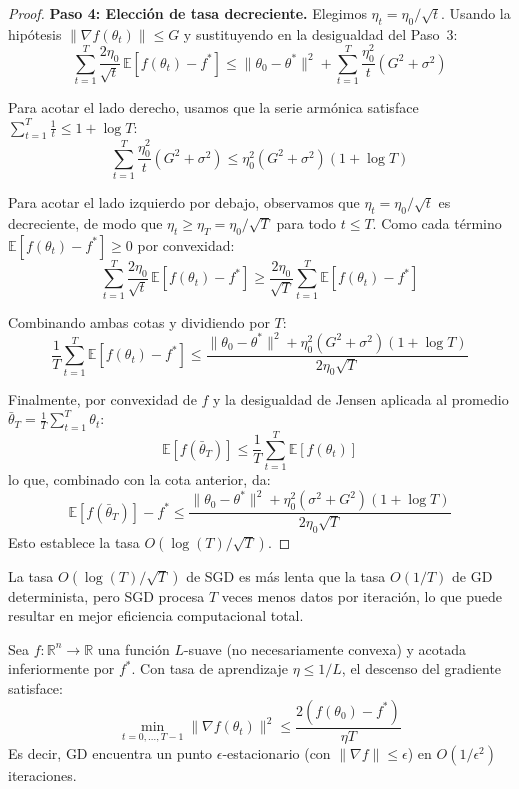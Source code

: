 \begin{proof}
	\textbf{Paso 4: Elección de tasa decreciente.}
	Elegimos \(\eta_t = \eta_0/\sqrt{t}\). Usando la hipótesis \(\|\nabla f(\theta_t)\| \leq G\) y sustituyendo en la desigualdad del Paso~3:
	\[
		\sum_{t=1}^T \frac{2\eta_0}{\sqrt{t}}\, \mathbb{E}[f(\theta_t) - f^*] \leq \|\theta_0 - \theta^*\|^2 + \sum_{t=1}^T \frac{\eta_0^2}{t}(G^2 + \sigma^2)
	\]

	Para acotar el lado derecho, usamos que la serie armónica satisface \(\sum_{t=1}^T \frac{1}{t} \leq 1 + \log T\):
	\[
		\sum_{t=1}^T \frac{\eta_0^2}{t}(G^2 + \sigma^2) \leq \eta_0^2(G^2 + \sigma^2)(1 + \log T)
	\]

	Para acotar el lado izquierdo por debajo, observamos que \(\eta_t = \eta_0/\sqrt{t}\) es decreciente, de modo que \(\eta_t \geq \eta_T = \eta_0/\sqrt{T}\) para todo \(t \leq T\). Como cada término \(\mathbb{E}[f(\theta_t) - f^*] \geq 0\) por convexidad:
	\[
		\sum_{t=1}^T \frac{2\eta_0}{\sqrt{t}}\, \mathbb{E}[f(\theta_t) - f^*] \geq \frac{2\eta_0}{\sqrt{T}} \sum_{t=1}^T \mathbb{E}[f(\theta_t) - f^*]
	\]

	Combinando ambas cotas y dividiendo por \(T\):
	\[
		\frac{1}{T}\sum_{t=1}^T \mathbb{E}[f(\theta_t) - f^*] \leq \frac{\|\theta_0 - \theta^*\|^2 + \eta_0^2(G^2 + \sigma^2)(1 + \log T)}{2\eta_0\sqrt{T}}
	\]

	Finalmente, por convexidad de \(f\) y la desigualdad de Jensen aplicada al promedio \(\bar{\theta}_T = \frac{1}{T}\sum_{t=1}^T \theta_t\):
	\[
		\mathbb{E}[f(\bar{\theta}_T)] \leq \frac{1}{T}\sum_{t=1}^T \mathbb{E}[f(\theta_t)]
	\]
	lo que, combinado con la cota anterior, da:
	\[
		\mathbb{E}[f(\bar{\theta}_T)] - f^* \leq \frac{\|\theta_0 - \theta^*\|^2 + \eta_0^2(\sigma^2 + G^2)(1 + \log T)}{2\eta_0\sqrt{T}}
	\]
	Esto establece la tasa \(O(\log(T)/\sqrt{T})\).
\end{proof}

La tasa \(O(\log(T)/\sqrt{T})\) de \gls{SGD} es más lenta que la tasa \(O(1/T)\) de \gls{GD} determinista, pero \gls{SGD} procesa \(T\) veces menos datos por iteración, lo que puede resultar en mejor eficiencia computacional total.

\begin{theorem}\label{thm:gd_nonconvex}
	Sea \(f: \mathbb{R}^n \to \mathbb{R}\) una función \(L\)-suave (no necesariamente convexa) y acotada inferiormente por \(f^*\). Con tasa de aprendizaje \(\eta \leq 1/L\), el descenso del gradiente satisface:
	\[
		\min_{t=0,\ldots,T-1} \|\nabla f(\theta_t)\|^2 \leq \frac{2(f(\theta_0) - f^*)}{\eta T}
	\]
	Es decir, \gls{GD} encuentra un punto \(\epsilon\)-estacionario (con \(\|\nabla f\| \leq \epsilon\)) en \(O(1/\epsilon^2)\) iteraciones.
\end{theorem}

